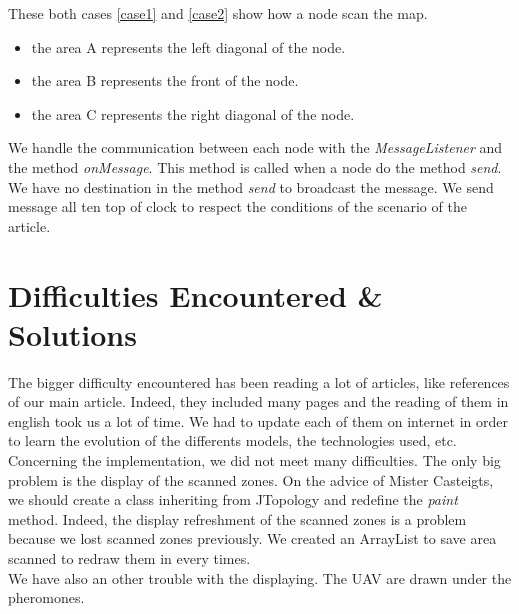 These both cases \ref{case1} and \ref{case2} show how a node scan the map.

\begin{itemize}
\item the area A represents the left diagonal of the node.
\item the area B represents the front of the node.
\item the area C represents the right diagonal of the node.
\end{itemize}

We handle the communication between each node with the \textit{MessageListener} and the method \textit{onMessage}. This method is called when a node do the method \textit{send}. We have no destination in the method \textit{send} to broadcast the message. We send message all ten top of clock to respect the conditions of the scenario of the article.

\newpage

\section{Difficulties Encountered \& Solutions}

The bigger difficulty encountered has been reading a lot of articles, like references of our main article. Indeed, they included many pages and the reading of them in english took us a lot of time. We had to update each of them on internet in order to learn the evolution of the differents models, the technologies used, etc.\\

Concerning the implementation, we did not meet many difficulties. The only big problem is the display of the scanned zones. On the advice of Mister Casteigts, we should create a class inheriting from JTopology and redefine the \textit{paint} method. Indeed, the display refreshment of the scanned zones is a problem because we lost scanned zones previously. We created an ArrayList to save area scanned to redraw them in every times.\\

We have also an other trouble with the displaying. The UAV are drawn under the pheromones.
